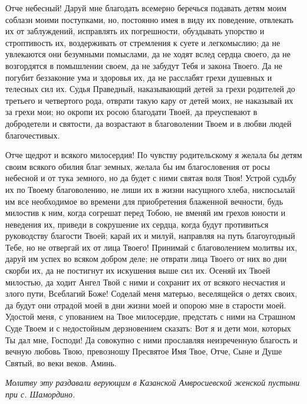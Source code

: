 \begin{mymulticols}
Отче небесный! Даруй мне благодать всемерно беречься подавать детям моим соблазн моими поступками, но, постоянно имея в виду их поведение, отвлекать их от заблуждений, исправлять их погрешности, обуздывать упорство и строптивость их, воздерживать от стремления к суете и легкомыслию; да не увлекаются они безумными помыслами, да не ходят вслед сердца своего, да не возгордятся в помышлении своем, да не забудут Тебя и закона Твоего. Да не погубит беззаконие ума и здоровья их, да не расслабят грехи душевных и телесных сил их. Судья Праведный, наказывающий детей за грехи родителей до третьего и четвертого рода, отврати такую кару от детей моих, не наказывай их за грехи мои; но окропи их росою благодати Твоей, да преуспевают в добродетели и святости, да возрастают в благоволении Твоем и в любви людей благочестивых.


Отче щедрот и всякого милосердия! По чувству родительскому я желала бы детям своим всякого обилия благ земных, желала бы им благословения от росы небесной и от тука земного, но да будет с ними святая воля Твоя! Устрой судьбу их по Твоему благоволению, не лиши их в жизни насущного хлеба, ниспосылай им все необходимое во времени для приобретения блаженной вечности, будь милостив к ним, когда согрешат перед Тобою, не вменяй им грехов юности и неведения их, приведи в сокрушение их сердца, когда будут противиться руководству благости Твоей; карай их и милуй, направляя на путь благоугодный Тебе, но не отвергай их от лица Твоего! Принимай с благоволением молитвы их, даруй им успех во всяком добром деле; не отврати лица Твоего от них во дни скорби их, да не постигнут их искушения выше сил их. Осеняй их Твоей милостью, да ходит Ангел Твой с ними и сохранит их от всякого несчастия и злого пути, Всеблагий Боже! Соделай меня матерью, веселящейся о детях своих, да будут они отрадой моей в дни жизни моей и опорою мне в старости моей. Удостой меня, с упованием на Твое милосердие, предстать с ними на Страшном Суде Твоем и с недостойным дерзновением сказать: Вот я и дети мои, которых Ты дал мне, Господи! Да совокупно с ними прославляя неизреченную благость и вечную любовь Твою, превозношу Пресвятое Имя Твое, Отче, Сыне и Душе Святый, во веки веков. Аминь.

\itshape Молитву эту раздавали верующим в Казанской Амвросиевской женской пустыни при с. Шамордино.

\normalfont{}

\end{mymulticols}

